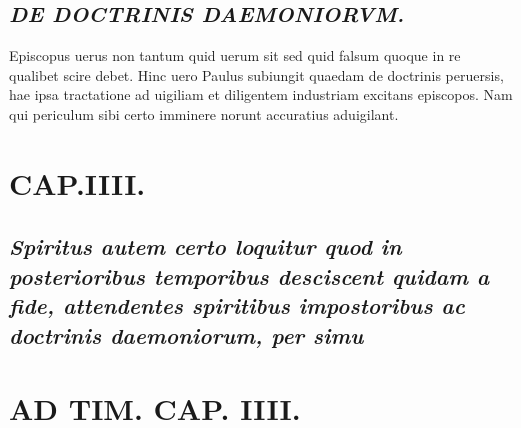 \documentclass{article}
\begin{document}
\begin{pages}
\subsection*{\textit{DE DOCTRINIS DAEMONIORVM. }}\pstart Episcopus uerus non tantum quid uerum sit sed quid falsum quoque in re qualibet scire debet. Hinc uero Paulus subiungit quaedam de doctrinis peruersis, hae ipsa tractatione ad uigiliam et diligentem industriam excitans episcopos. Nam qui periculum sibi certo imminere norunt accuratius aduigilant.  \pend
\endnumbering\beginnumbering\section{CAP.IIII.}
{}
\subsection*{\textit{Spiritus autem certo loquitur quod in posterioribus temporibus desciscent quidam a fide, attendentes spiritibus impostoribus ac doctrinis daemoniorum, per simu}}
{}
\subsection*{\textit{}}
\section*{AD TIM. CAP. IIII. }
\marginpar{[ p.137 ]}
{}

\end{pages}
\end{document}

